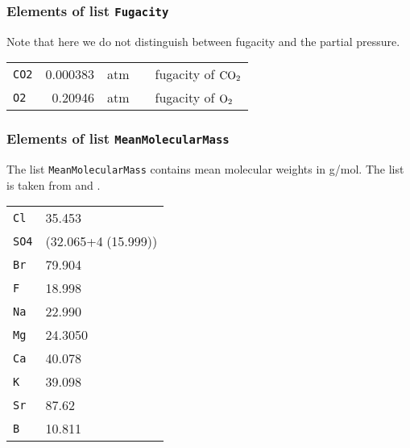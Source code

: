 \documentclass[a4paper]{article}
\begin{document}
\subsubsection{Elements of list \texttt{Fugacity}}
Note that here we do not distinguish between fugacity and the partial pressure.\\


\begin{tabular}{|lrlll|}  \hline
\texttt{CO2} & 0.000383 & atm & \citep{Borges2004a, Guinotte2008}  & fugacity of $\rm CO_2$\\
\texttt{O2}  & 0.20946  & atm & \citep{Williams2004} & fugacity of $\rm O_2$ \\ \hline
\end{tabular}



\subsubsection{Elements of list \texttt{MeanMolecularMass}}
The list  \texttt{MeanMolecularMass} contains mean molecular weights in g/mol. The list is taken from \citet[chap. 5, p. 3]{DOE1994} and \citet[chap. 5, p. 4]{Dickson2007}.\\
\begin{center}
\begin{tabular}{|ll|} \hline
\texttt{Cl}  & 35.453\\
\texttt{SO4} & (32.065+4$\;$(15.999))\\
\texttt{Br}  & 79.904\\
\texttt{F}   & 18.998\\
\texttt{Na}  & 22.990\\
\texttt{Mg}  & 24.3050\\
\texttt{Ca}  & 40.078\\
\texttt{K}   & 39.098\\
\texttt{Sr}  & 87.62\\
\texttt{B}   & 10.811\\ \hline
\end{tabular}
\end{center}
\end{document}
